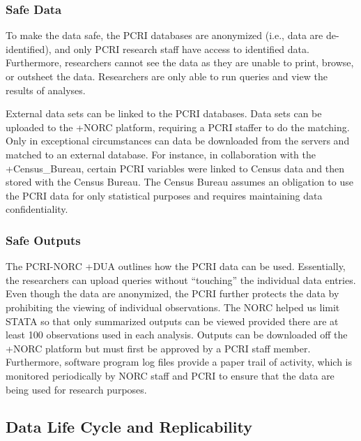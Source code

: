 \documentclass[
]{WileySix}
\begin{document}
\hypertarget{safe-data-3}{%
\subsubsection{Safe Data}\label{safe-data-3}}

To make the data safe, the PCRI databases are anonymized (i.e., data are de-identified), and only PCRI research staff have access to identified data. Furthermore, researchers cannot see the data as they are unable to print, browse, or outsheet the data. Researchers are only able to run queries and view the results of analyses.

External data sets can be linked to the PCRI databases. Data sets can be uploaded to the +NORC\textbar{} platform, requiring a PCRI staffer to do the matching. Only in exceptional circumstances can data be downloaded from the servers and matched to an external database. For instance, in collaboration with the +Census\_Bureau\textbar, certain PCRI variables were linked to Census data and then stored with the Census Bureau. The Census Bureau assumes an obligation to use the PCRI data for only statistical purposes and requires maintaining data confidentiality.

\hypertarget{safe-outputs-3}{%
\subsubsection{Safe Outputs}\label{safe-outputs-3}}

The PCRI-NORC +DUA\textbar{} outlines how the PCRI data can be used. Essentially, the researchers can upload queries without ``touching'' the individual data entries. Even though the data are anonymized, the PCRI further protects the data by prohibiting the viewing of individual observations. The NORC helped us limit STATA so that only summarized outputs can be viewed provided there are at least 100 observations used in each analysis. Outputs can be downloaded off the +NORC\textbar{} platform but must first be approved by a PCRI staff member. Furthermore, software program log files provide a paper trail of activity, which is monitored periodically by NORC staff and PCRI to ensure that the data are being used for research purposes.

\hypertarget{data-life-cycle-and-replicability-2}{%
\subsection{Data Life Cycle and Replicability}\label{data-life-cycle-and-replicability-2}}
\end{document}
